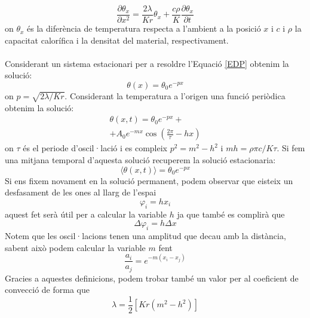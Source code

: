 \documentclass[12pt,twosides,onecolumn,openany]{article}
\begin{document}
\begin{multicols}{2}
\begin{equation}\label{EDP}
  \frac{\partial \theta_x}{\partial x^2} = \frac{2\lambda}{Kr}\theta_x + \frac{c\rho}{K}\frac{\partial \theta_x}{\partial t}
\end{equation}
on $\theta_x$ és la diferència de temperatura respecta a l'ambient a la posició $x$ i $c$ i $\rho$ la capacitat calorífica i la densitat del material, respectivament.\\\\ Considerant un sistema estacionari per a resoldre l'Equació \eqref{EDP} obtenim la solució:
\begin{equation}\label{sol_estacionaria}
  \theta(x) = \theta_0e^{-px}
\end{equation}
on $p = \sqrt{2\lambda/Kr}$. Considerant la temperatura a l'origen una funció periòdica obtenim la solució:
\begin{multline}\label{sol_permanent}
  \theta(x,t) = \theta_0e^{-px} +\\
   + A_0e^{-mx}\cos{\left( \frac{2\pi}{\tau} -hx \right)} 
\end{multline}
on $\tau$ és el periode d'oscil·lació i es compleix $p^2 = m^2-h^2$ i $mh = \rho \pi c / K \tau$. Si fem una mitjana temporal d'aquesta solució recuperem la solució estacionaria:
\begin{equation}\label{prom_temp}
  \langle \theta(x,t) \rangle = \theta_0e^{-px}  
\end{equation}
Si ens fixem novament en la solució permanent, podem observar que eisteix un desfasament de les ones al llarg de l'espai
\begin{equation}\label{desfasament}
  \varphi_i = hx_i
\end{equation}
aquest fet serà útil per a calcular la variable $h$ ja que també es complirà que
\begin{equation}\label{increment_desfasament}
  \Delta \varphi_i = h\Delta x
\end{equation}
Notem que les oscil·lacions tenen una amplitud que decau amb la distància, sabent això podem calcular la variable $m$ fent
\begin{equation}\label{trobar_m}
  \frac{a_i}{a_j} = e^{-m(x_i-x_j)}
\end{equation}
Gracies a aquestes definicions, podem trobar també un valor per al coeficient de convecció de forma que
\begin{equation}\label{valor_lambda}
  \lambda = \frac{1}{2}[Kr(m^2 - h^2)]
\end{equation}

\end{multicols}
\end{document}
